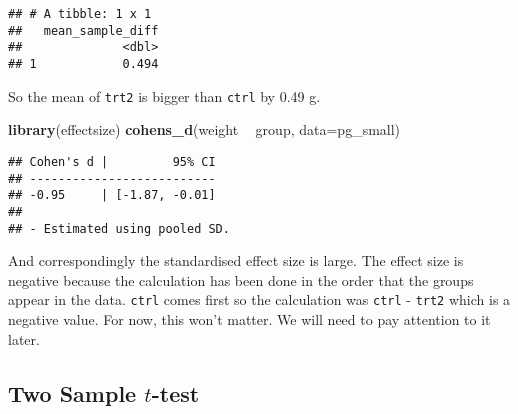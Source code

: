\documentclass[
]{book}
\newenvironment{Shaded}{\begin{snugshade}}{\end{snugshade}}
\newcommand{\DataTypeTok}[1]{\textcolor[rgb]{0.13,0.29,0.53}{#1}}
\newcommand{\KeywordTok}[1]{\textcolor[rgb]{0.13,0.29,0.53}{\textbf{#1}}}
\newcommand{\NormalTok}[1]{#1}
\newcommand{\OperatorTok}[1]{\textcolor[rgb]{0.81,0.36,0.00}{\textbf{#1}}}
\newcommand{\StringTok}[1]{\textcolor[rgb]{0.31,0.60,0.02}{#1}}
\begin{document}
\begin{Shaded}
\end{Shaded}

\begin{verbatim}
## # A tibble: 1 x 1
##   mean_sample_diff
##              <dbl>
## 1            0.494
\end{verbatim}

So the mean of \texttt{trt2} is bigger than \texttt{ctrl} by 0.49 g.

\begin{Shaded}
\begin{Highlighting}[]
\KeywordTok{library}\NormalTok{(effectsize)}
\KeywordTok{cohens_d}\NormalTok{(weight }\OperatorTok{~}\StringTok{ }\NormalTok{group, }\DataTypeTok{data=}\NormalTok{pg_small)}
\end{Highlighting}
\end{Shaded}

\begin{verbatim}
## Cohen's d |         95% CI
## --------------------------
## -0.95     | [-1.87, -0.01]
## 
## - Estimated using pooled SD.
\end{verbatim}

And correspondingly the standardised effect size is large. The effect size is negative because the calculation has been done in the order that the groups appear in the data. \texttt{ctrl} comes first so the calculation was \texttt{ctrl} - \texttt{trt2} which is a negative value. For now, this won't matter. We will need to pay attention to it later.

\hypertarget{two-sample-t-test}{%
\subsection{\texorpdfstring{Two Sample \(t\)-test}{Two Sample t-test}}\label{two-sample-t-test}}
\end{document}
